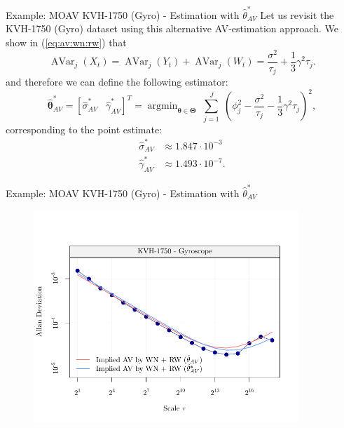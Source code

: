 \documentclass[envcountsect,usenames,dvipsnames]{beamer}
\DeclareMathOperator{\AV}{AVar}
\DeclareMathOperator*{\argmin}{argmin}
\def\btheta{\bm \theta}
\def\bTheta{\bm \Theta}
\theoremstyle{mystyle}
\begin{document}
\begin{frame}{Example: MOAV KVH-1750 (Gyro) - Estimation with $\hat{\theta}_{AV}^*$}
\small
Let us revisit the KVH-1750 (Gyro) dataset using this alternative AV-estimation approach. We show in (\ref{eq:av:wn:rw}) that
%
\begin{equation*}
        \AV_j(X_t) = \AV_j(Y_t) + \AV_j(W_t) =  \frac{\sigma^2}{\tau_j} + \frac{1}{3} \gamma^2 \tau_j.
\end{equation*}  
%
and therefore we can define the following estimator:
%
\begin{equation*}
        \hat{\btheta}_{AV}^* = [\hat{\sigma}_{AV}^* \;\;\;  \hat{\gamma}_{AV}^*]^T = \argmin_{\btheta \in \bTheta} \; \sum_{j = 1}^J \; \left( \phi_j^2 -  \frac{\sigma^2}{\tau_j} - \frac{1}{3} \gamma^2 \tau_j \right)^2,
\end{equation*}
%
corresponding to the point estimate:
%
\begin{equation*}
    \begin{aligned}
         \hat{\sigma}_{AV}^* & \approx 1.847 \cdot 10^{-3}\\
         \hat{\gamma}_{AV}^* & \approx 1.493 \cdot 10^{-7}.
    \end{aligned}
\end{equation*}
%
\end{frame}


\begin{frame}{Example: MOAV KVH-1750 (Gyro) - Estimation with $\hat{\theta}_{AV}^*$}
\vspace{-0.75cm}
    \begin{figure}
	    \centering
	  \includegraphics[width = 10cm]{Images/av_example_kvh_part5.pdf}
	\end{figure}
\end{frame}
\end{document}
